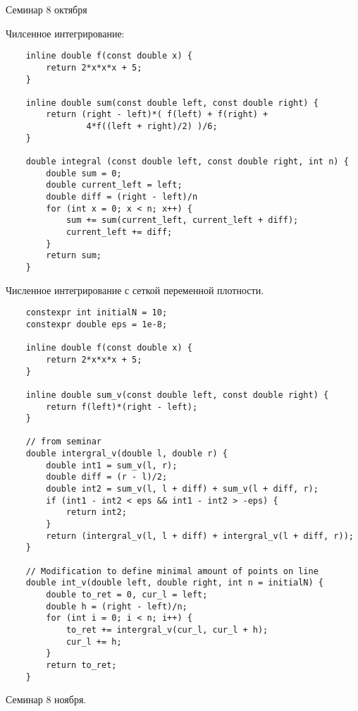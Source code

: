 \documentclass[12pt, a4paper]{article}
\begin{document}
    \newpage
    \begin{center}
        Семинар 8 октября
    \end{center}
    Чилсенное интегрирование:
    \begin{lstlisting}
    inline double f(const double x) {
        return 2*x*x*x + 5;
    }

    inline double sum(const double left, const double right) {
        return (right - left)*( f(left) + f(right) + 
                4*f((left + right)/2) )/6;
    }
    
    double integral (const double left, const double right, int n) {
        double sum = 0;
        double current_left = left;
        double diff = (right - left)/n
        for (int x = 0; x < n; x++) {
            sum += sum(current_left, current_left + diff);
            current_left += diff;
        }
        return sum;
    }
    \end{lstlisting}
    \newpage
    Численное интегрирование с сеткой переменной плотности.
    \begin{lstlisting}
    constexpr int initialN = 10;
    constexpr double eps = 1e-8;

    inline double f(const double x) {
        return 2*x*x*x + 5;
    }
    
    inline double sum_v(const double left, const double right) {
        return f(left)*(right - left);
    }
        
    // from seminar
    double intergral_v(double l, double r) {
        double int1 = sum_v(l, r);
        double diff = (r - l)/2;
        double int2 = sum_v(l, l + diff) + sum_v(l + diff, r);
        if (int1 - int2 < eps && int1 - int2 > -eps) {
            return int2;
        }
        return (intergral_v(l, l + diff) + intergral_v(l + diff, r));
    }

    // Modification to define minimal amount of points on line
    double int_v(double left, double right, int n = initialN) {
        double to_ret = 0, cur_l = left;
        double h = (right - left)/n;
        for (int i = 0; i < n; i++) {
            to_ret += intergral_v(cur_l, cur_l + h);
            cur_l += h;
        }
        return to_ret;
    }
    \end{lstlisting}
    \begin{center}
        Семинар 8 ноября.
    \end{center}
\end{document}

